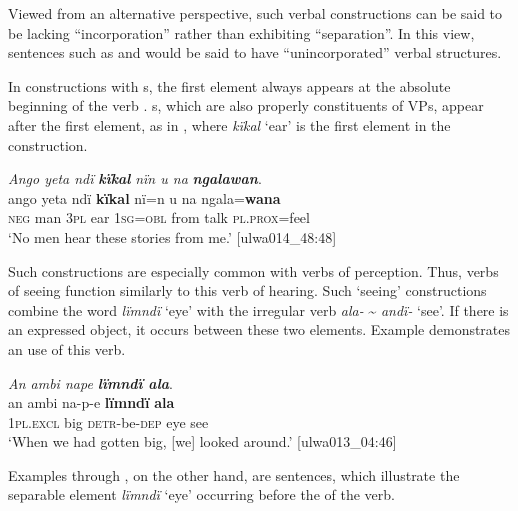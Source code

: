 Viewed from an alternative perspective, such verbal constructions can be said to be lacking “incorporation” rather than exhibiting “separation”. In this view, sentences such as  and  would be said to have “unincorporated” verbal structures.

  In constructions with s, the first element always appears at the absolute beginning of the verb . s, which are also properly constituents of VPs, appear after the first element, as in , where \textit{kïkal} ‘ear’ is the first element in the  construction.

\ea%
    \label{ex:phrase:57}
          \textit{Ango yeta ndï} \textbf{\textit{kïkal}} \textit{nïn u na} \textbf{\textit{ngalawan}}.\\
\gll ango  yeta  ndï  \textbf{kïkal}  nï=n    u    na    ngala=\textbf{wana}\\
    \textsc{neg}  man  3\textsc{pl}  ear    1\textsc{sg=obl}  from  talk  \textsc{pl.prox}=feel\\
\glt `No men hear these stories from me.’ [ulwa014\_48:48]
\z

Such  constructions are especially common with  verbs of perception. Thus, verbs of seeing function similarly to this verb of hearing. Such ‘seeing’ constructions combine the word \textit{lïmndï} ‘eye’ with the irregular  verb \textit{ala-} {\textasciitilde} \textit{andï-} ‘see’. If there is an expressed object, it occurs between these two elements. Example  demonstrates an  use of this verb.

\ea%
    \label{ex:phrase:58}
          \textit{An ambi nape \textbf{lïmndï ala}}.\\
\gll an      ambi  na-p-e      \textbf{lïmndï}  \textbf{ala}\\
    1\textsc{pl.excl}  big    \textsc{detr-}be\textsc{{}-dep} eye    see\\
\glt `When we had gotten big, [we] looked around.’ [ulwa013\_04:46]
\z

Examples  through , on the other hand, are  sentences, which illustrate the separable element \textit{lïmndï} ‘eye’ occurring before the  of the verb.


